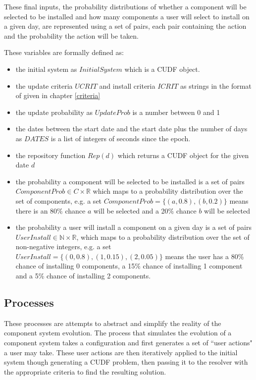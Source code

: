 These final inputs, the probability distributions of whether a component will be selected to be installed and how many components a user will select to install on a given day,
are represented using a set of pairs, each pair containing the action and the probability the action will be taken.

These variables are formally defined as:
\begin{itemize}
  \item the initial system as $InitialSystem$ which is a CUDF object.
  \item the update criteria $UCRIT$ and install criteria $ICRIT$ as strings in the format of given in chapter \ref{criteria}
  \item the update probability as $UpdateProb$ is a number between 0 and 1
  \item the dates between the start date and the start date plus the number of days as $DATES$ is a list of integers of seconds since the epoch.
  \item the repository function $Rep(d)$ which returns a CUDF object for the given date $d$
  \item the probability a component will be selected to be installed is a set of pairs $ComponentProb \in C \times \mathbb{R}$ which maps to a probability distribution over the set of components,
  e.g. a set $ComponentProb = \{ (a,0.8) , (b,0.2)\}$ means there is an 80\% chance $a$ will be selected and a 20\% chance $b$ will be selected
  \item the probability a user will install a component on a given day is a set of pairs $UserInstall \in \mathbb{N} \times \mathbb{R}$, which maps to a probability distribution over the set of non-negative integers,
  e.g.  a set $UserInstall = \{ (0,0.8) , (1,0.15), (2,0.05)\}$ means the user has a 80\% chance of installing 0 components, a 15\% chance of installing 1 component and a
  5\% chance of installing 2 components.
\end{itemize} 


\subsection{Processes}
These processes are attempts to abstract and simplify the reality of the component system evolution.
The process that simulates the evolution of a component system takes a configuration and first generates a set of ``user actions" a user may take.
These user actions are then iteratively applied to the initial system though generating a CUDF problem,
then passing it to the resolver with the appropriate criteria to find the resulting solution.

